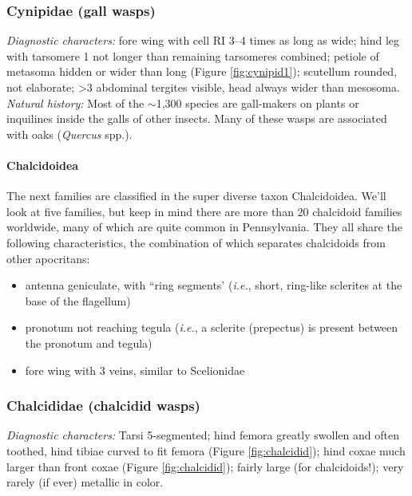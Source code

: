 \documentclass[letterpaper, 11pt]{article}
\begin{document}
\subsubsection{Cynipidae (gall wasps)}
\noindent{}\textit{Diagnostic characters:} fore wing with cell RI 3--4 times as long as wide; hind leg with tarsomere 1 not longer than remaining tarsomeres combined; petiole of metasoma hidden or wider than long (Figure \ref{fig:cynipid1}); scutellum rounded, not elaborate; \textgreater{}3 abdominal tergites visible, head always wider than mesosoma.\\

\noindent{}\textit{Natural history:} Most of the $\sim$1,300 species are gall-makers on plants or inquilines inside the galls of other insects. Many of these wasps are associated with oaks (\textit{Quercus} spp.).\\

\paragraph*{Chalcidoidea} The next families are classified in the super diverse taxon Chalcidoidea. We'll look at five families, but keep in mind there are more than 20 chalcidoid families worldwide, many of which are quite common in Pennsylvania. They all share the following characteristics, the combination of which separates chalcidoids from other apocritans:
\begin{itemize}
\item antenna geniculate, with ``ring segments' (\textit{i.e.}, short, ring-like sclerites at the base of the flagellum)
\item pronotum not reaching tegula (\textit{i.e.}, a sclerite (prepectus) is present between the pronotum and tegula)
\item fore wing with 3 veins, similar to Scelionidae
\end{itemize}

\subsubsection{Chalcididae (chalcidid wasps)}
\noindent{}\textit{Diagnostic characters:} Tarsi 5-segmented; hind femora greatly swollen and often toothed, hind tibiae curved to fit femora (Figure \ref{fig:chalcidid}); hind coxae much larger than front coxae (Figure \ref{fig:chalcidid}); fairly large (for chalcidoids!); very rarely (if ever) metallic in color.\\
\end{document}
